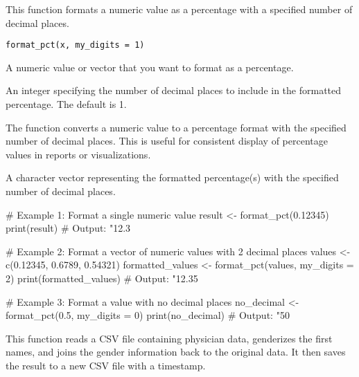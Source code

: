 \documentclass[a4paper]{book}
\begin{document}
%
\begin{Description}
This function formats a numeric value as a percentage with a specified number of decimal places.
\end{Description}
%
\begin{Usage}
\begin{verbatim}
format_pct(x, my_digits = 1)
\end{verbatim}
\end{Usage}
%
\begin{Arguments}
\begin{ldescription}
\item[\code{x}] A numeric value or vector that you want to format as a percentage.

\item[\code{my\_digits}] An integer specifying the number of decimal places to include in the formatted percentage. The default is 1.
\end{ldescription}
\end{Arguments}
%
\begin{Details}
The function converts a numeric value to a percentage format with the specified number of decimal places.
This is useful for consistent display of percentage values in reports or visualizations.
\end{Details}
%
\begin{Value}
A character vector representing the formatted percentage(s) with the specified number of decimal places.
\end{Value}
%
\begin{Examples}
\begin{ExampleCode}
# Example 1: Format a single numeric value
result <- format_pct(0.12345)
print(result)  # Output: "12.3%

# Example 2: Format a vector of numeric values with 2 decimal places
values <- c(0.12345, 0.6789, 0.54321)
formatted_values <- format_pct(values, my_digits = 2)
print(formatted_values)  # Output: "12.35%

# Example 3: Format a value with no decimal places
no_decimal <- format_pct(0.5, my_digits = 0)
print(no_decimal)  # Output: "50%

\end{ExampleCode}
\end{Examples}
%
\begin{Description}
This function reads a CSV file containing physician data, genderizes the first names,
and joins the gender information back to the original data. It then saves the
result to a new CSV file with a timestamp.
\end{Description}
\end{document}
